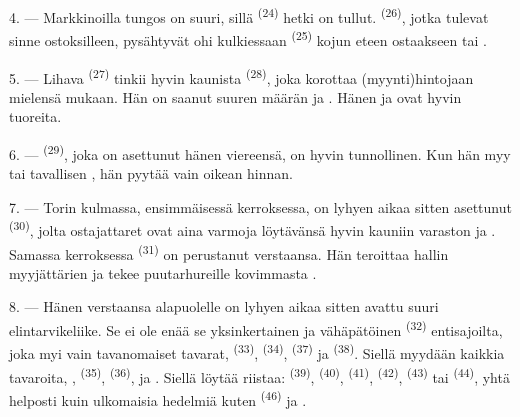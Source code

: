 \VUsaut{4.0mm}
\VUsaut{3.0mm}

4. --- Markkinoilla tungos on suuri, sillä 
\textsuperscript{(24)} hetki on tullut. 
\textsuperscript{(26)}, jotka tulevat sinne ostoksilleen, pysähtyvät ohi
kulkiessaan  \textsuperscript{(25)} kojun eteen
ostaakseen  tai .

5. --- Lihava  \textsuperscript{(27)} tinkii hyvin kaunista
  \textsuperscript{(28)}, joka
korottaa (myynti)hintojaan mielensä mukaan. Hän on saanut suuren määrän
 ja . Hänen
 ja  ovat hyvin tuoreita.

\VUsaut{4.0mm}
\VUsaut{3.0mm}

6. ---  \textsuperscript{(29)}, joka on asettunut hänen
viereensä, on hyvin tunnollinen. Kun hän myy 
tai tavallisen , hän pyytää vain oikean hinnan.

7. --- Torin kulmassa, ensimmäisessä kerroksessa, on lyhyen aikaa sitten
asettunut  \textsuperscript{(30)}, jolta
ostajattaret ovat aina varmoja löytävänsä hyvin kauniin varaston
 ja .
Samassa kerroksessa  \textsuperscript{(31)} on
perustanut verstaansa. Hän teroittaa hallin myyjättärien  ja
tekee puutarhureille  kovimmasta .

\VUsaut{4.0mm}
\VUsaut{3.0mm}

8. --- Hänen verstaansa alapuolelle on lyhyen aikaa sitten avattu suuri
elintarvikeliike. Se ei ole enää se yksinkertainen ja vähäpätöinen
 \textsuperscript{(32)} entisajoilta, joka myi
vain tavanomaiset tavarat,  \textsuperscript{(33)},
 \textsuperscript{(34)}, 
\textsuperscript{(37)} ja  \textsuperscript{(38)}. Siellä
myydään kaikkia tavaroita, , 
\textsuperscript{(35)},  \textsuperscript{(36)},
 ja .
Siellä löytää riistaa:  \textsuperscript{(39)},
 \textsuperscript{(40)}, 
\textsuperscript{(41)},  \textsuperscript{(42)},
 \textsuperscript{(43)} tai 
\textsuperscript{(44)}, yhtä helposti kuin ulkomaisia hedelmiä kuten
 \textsuperscript{(46)} ja .

